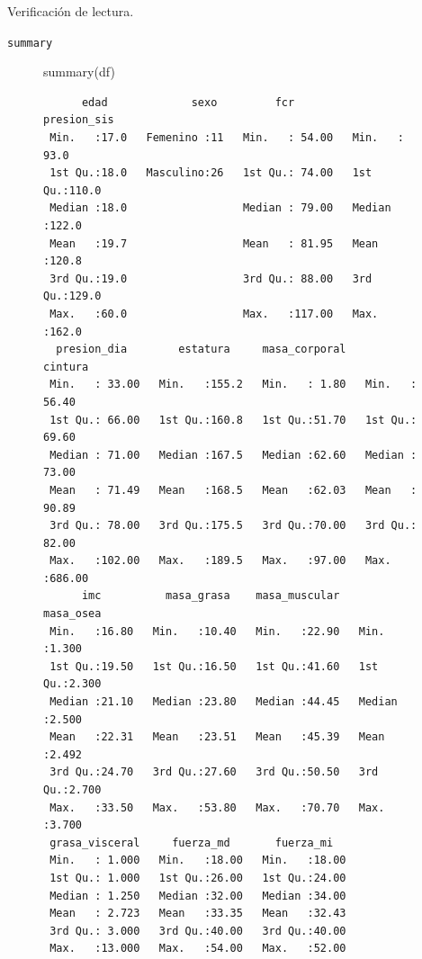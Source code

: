\documentclass[
  ignorenonframetext,
]{beamer}
\newenvironment{Shaded}{\begin{snugshade}}{\end{snugshade}}
\newcommand{\FunctionTok}[1]{\textcolor[rgb]{0.28,0.35,0.67}{#1}}
\newcommand{\NormalTok}[1]{\textcolor[rgb]{0.00,0.23,0.31}{#1}}
\begin{document}
\begin{frame}[fragile]{Verificación de lectura.}
\label{verificaciuxf3n-de-lectura.}
\begin{block}{\texttt{summary}}
\label{summary}
\begin{figure}

\begin{Shaded}
\begin{Highlighting}[]
\FunctionTok{summary}\NormalTok{(df)   }
\end{Highlighting}
\end{Shaded}

\begin{verbatim}
      edad             sexo         fcr          presion_sis   
 Min.   :17.0   Femenino :11   Min.   : 54.00   Min.   : 93.0  
 1st Qu.:18.0   Masculino:26   1st Qu.: 74.00   1st Qu.:110.0  
 Median :18.0                  Median : 79.00   Median :122.0  
 Mean   :19.7                  Mean   : 81.95   Mean   :120.8  
 3rd Qu.:19.0                  3rd Qu.: 88.00   3rd Qu.:129.0  
 Max.   :60.0                  Max.   :117.00   Max.   :162.0  
  presion_dia        estatura     masa_corporal      cintura      
 Min.   : 33.00   Min.   :155.2   Min.   : 1.80   Min.   : 56.40  
 1st Qu.: 66.00   1st Qu.:160.8   1st Qu.:51.70   1st Qu.: 69.60  
 Median : 71.00   Median :167.5   Median :62.60   Median : 73.00  
 Mean   : 71.49   Mean   :168.5   Mean   :62.03   Mean   : 90.89  
 3rd Qu.: 78.00   3rd Qu.:175.5   3rd Qu.:70.00   3rd Qu.: 82.00  
 Max.   :102.00   Max.   :189.5   Max.   :97.00   Max.   :686.00  
      imc          masa_grasa    masa_muscular     masa_osea    
 Min.   :16.80   Min.   :10.40   Min.   :22.90   Min.   :1.300  
 1st Qu.:19.50   1st Qu.:16.50   1st Qu.:41.60   1st Qu.:2.300  
 Median :21.10   Median :23.80   Median :44.45   Median :2.500  
 Mean   :22.31   Mean   :23.51   Mean   :45.39   Mean   :2.492  
 3rd Qu.:24.70   3rd Qu.:27.60   3rd Qu.:50.50   3rd Qu.:2.700  
 Max.   :33.50   Max.   :53.80   Max.   :70.70   Max.   :3.700  
 grasa_visceral     fuerza_md       fuerza_mi    
 Min.   : 1.000   Min.   :18.00   Min.   :18.00  
 1st Qu.: 1.000   1st Qu.:26.00   1st Qu.:24.00  
 Median : 1.250   Median :32.00   Median :34.00  
 Mean   : 2.723   Mean   :33.35   Mean   :32.43  
 3rd Qu.: 3.000   3rd Qu.:40.00   3rd Qu.:40.00  
 Max.   :13.000   Max.   :54.00   Max.   :52.00  
\end{verbatim}

\end{figure}%
\end{block}
\end{frame}
\end{document}
